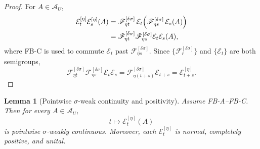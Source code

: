 \documentclass[12pt]{article}
\newtheorem{lemma}[theorem]{Lemma}
\theoremstyle{definition}
\theoremstyle{remark}
\begin{document}
\begin{proof}
For \(A\in\mathcal A_U\),
\begin{align*}
\mathcal E_t^{[\eta]}\mathcal E_s^{[\eta]}(A)
&=
\mathscr F_{\eta t}^{[\delta\sigma]}\,
\mathcal E_t
\Bigl(
\mathscr F_{\eta s}^{[\delta\sigma]}\,
\mathcal E_s(A)
\Bigr) \\
&=
\mathscr F_{\eta t}^{[\delta\sigma]}
\mathscr F_{\eta s}^{[\delta\sigma]}
\mathcal E_t\mathcal E_s(A),
\end{align*}
where FB-C is used to commute
\(\mathcal E_t\) past \(\mathscr F_{\eta s}^{[\delta\sigma]}\). Since
\(\{\mathscr F_r^{[\delta\sigma]}\}\) and \(\{\mathcal E_t\}\) are both
semigroups,
\[
\mathscr F_{\eta t}^{[\delta\sigma]}
\mathscr F_{\eta s}^{[\delta\sigma]}
\mathcal E_t\mathcal E_s
=
\mathscr F_{\eta(t+s)}^{[\delta\sigma]}
\mathcal E_{t+s}
=
\mathcal E_{t+s}^{[\eta]}.
\]
\end{proof}

\begin{lemma}[Pointwise \(\sigma\)-weak continuity and positivity]
\label{lem:continuity}
Assume FB-A--FB-C. Then for every \(A\in\mathcal A_U\),
\[
t\longmapsto \mathcal E_t^{[\eta]}(A)
\]
is pointwise \(\sigma\)-weakly continuous. Moreover, each
\(\mathcal E_t^{[\eta]}\) is normal, completely positive, and unital.
\end{lemma}
\end{document}
